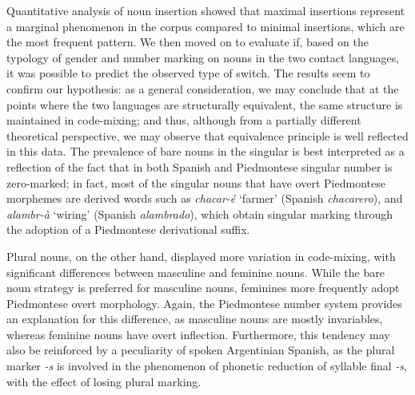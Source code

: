\documentclass[output=paper]{langscibook}
\begin{document}
Quantitative analysis of noun insertion showed that maximal insertions represent a marginal phenomenon in the corpus compared to minimal insertions, which are the most frequent pattern. We then moved on to evaluate if, based on the typology of gender and number marking on nouns in the two contact languages, it was possible to predict the observed type of switch. The results seem to confirm our hypothesis: as a general consideration, we may conclude that at the points where the two languages are structurally equivalent, the same structure is maintained in code-mixing; and thus, although from a partially different theoretical perspective, we may observe that  equivalence principle is well reflected in this data. The prevalence of bare nouns in the singular is best interpreted as a reflection of the fact that in both Spanish and Piedmontese singular number is zero-marked; in fact, most of the singular nouns that have overt Piedmontese morphemes are derived words such as \textit{chacar-é} ‘farmer’ (Spanish \textit{chacarero}), and \textit{alambr-à} ‘wiring’ (Spanish \textit{alambrado}), which obtain singular marking through the adoption of a Piedmontese derivational suffix.

Plural nouns, on the other hand, displayed more variation in code-mixing, with significant differences between masculine and feminine nouns. While the bare noun strategy is preferred for masculine nouns, feminines more frequently adopt Piedmontese overt morphology. Again, the Piedmontese number system provides an explanation for this difference, as masculine nouns are mostly invariables, whereas feminine nouns have overt inflection. Furthermore, this tendency may also be reinforced by a peculiarity of spoken Argentinian Spanish, as the plural marker \textit{{}-s} is involved in the phenomenon of phonetic reduction of syllable final \textit{{}-s}, with the effect of losing plural marking.
\end{document}
